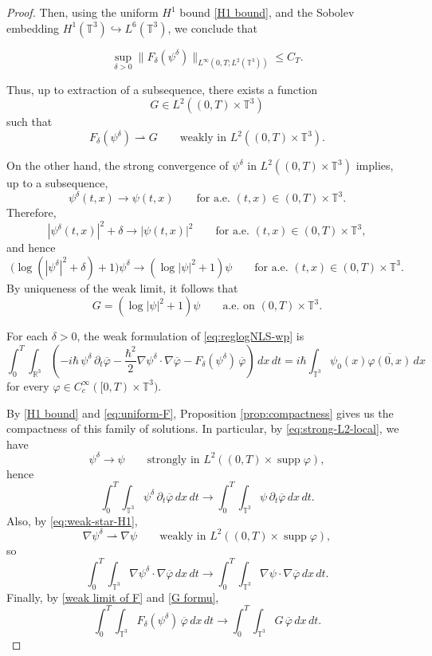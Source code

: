 \documentclass[11pt]{article}
\begin{document}
\begin{proof}
Then, using the uniform $H^1$ bound \eqref{H1 bound}, and  the Sobolev embedding $H^1(\mathbb{T}^3) \hookrightarrow L^6(\mathbb{T}^3)$, we conclude that

\begin{equation}\label{eq:uniform-F}
\sup_{\delta>0}\|F_\delta(\psi^\delta)\|_{L^\infty(0,T;L^2(\mathbb{T}^3))}\le C_{T}.
\end{equation}

Thus,   up to extraction of a subsequence, there exists a function 
\[
G\in L^2((0,T)\times \mathbb{T}^3)
\]
such that
\begin{equation}
\label{weak limit of F}
F_\delta(\psi^\delta)\rightharpoonup G
\qquad\text{weakly in }L^2((0,T)\times \mathbb{T}^3).
\end{equation}

On the other hand, the strong convergence of \(\psi^\delta\) in \(L^2((0,T)\times \mathbb{T}^3)\) implies, up to a subsequence,
\[
\psi^\delta(t,x)\to \psi(t,x)
\qquad\text{for a.e. }(t,x)\in(0,T)\times \mathbb{T}^3.
\]
Therefore,
\[
|\psi^\delta(t,x)|^2+\delta \to |\psi(t,x)|^2
\qquad\text{for a.e. }(t,x)\in(0,T)\times \mathbb{T}^3,
\]
and hence
\[
\bigl(\log(|\psi^\delta|^2+\delta)+1\bigr)\psi^\delta
\to
(\log|\psi|^2+1)\psi
\qquad\text{for a.e. }(t,x)\in(0,T)\times \mathbb{T}^3.
\]
By uniqueness of the weak limit, it follows that
\begin{equation}
\label{G formu}
G=(\log|\psi|^2+1)\psi
\qquad\text{a.e. on }(0,T)\times \mathbb{T}^3.
\end{equation}






For each \(\delta>0\), the weak formulation of \eqref{eq:reglogNLS-wp} is 
\begin{equation}\label{eq:weak-form-delta}
\int_0^T\!\!\int_{\mathbb{R}^3}
\left(
-i\hbar\,\psi^\delta\,\partial_t\overline{\varphi}
-\frac{\hbar^2}{2}\nabla\psi^\delta\cdot\nabla\overline{\varphi}
-F_\delta(\psi^\delta)\,\overline{\varphi}
\right)\,dx\,dt
=
i\hbar\int_{\mathbb{T}^3}\psi_0(x)\overline{\varphi(0,x)}\,dx
\end{equation}
for every \(\varphi\in C_c^\infty([0,T)\times\mathbb{T}^3)\).


By \eqref{H1 bound} and \eqref{eq:uniform-F},  Proposition \ref{prop:compactness} gives us the compactness of this family of solutions. In particular, 
by \eqref{eq:strong-L2-local}, we have
\[
\psi^\delta\to\psi
\qquad\text{strongly in }L^2((0,T)\times \operatorname{supp}\varphi),
\]
hence
\[
\int_0^T\!\!\int_{\mathbb{T}^3}
\psi^\delta\,\partial_t\overline{\varphi}\,dx\,dt
\to
\int_0^T\!\!\int_{\mathbb{T}^3}
\psi\,\partial_t\overline{\varphi}\,dx\,dt.
\]
Also, by \eqref{eq:weak-star-H1},
\[
\nabla\psi^\delta \rightharpoonup \nabla\psi
\qquad\text{weakly in }L^2((0,T)\times \operatorname{supp}\varphi),
\]
so
\[
\int_0^T\!\!\int_{\mathbb{T}^3}
\nabla\psi^\delta\cdot\nabla\overline{\varphi}\,dx\,dt
\to
\int_0^T\!\!\int_{\mathbb{T}^3}
\nabla\psi\cdot\nabla\overline{\varphi}\,dx\,dt.
\]
Finally, by \eqref{weak limit of F} and \eqref{G formu}, 
\[
\int_0^T\!\!\int_{\mathbb{T}^3}
F_\delta(\psi^\delta)\,\overline{\varphi}\,dx\,dt
\to
\int_0^T\!\!\int_{\mathbb{T}^3}
G\,\overline{\varphi}\,dx\,dt.
\]



\end{proof}
\end{document}
